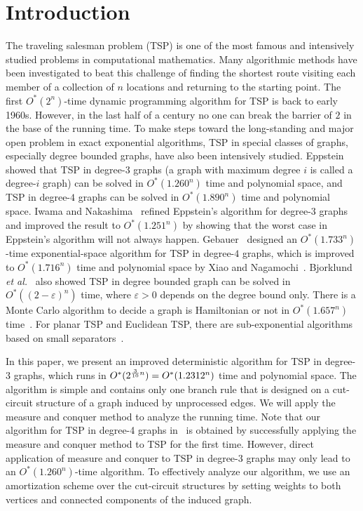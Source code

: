 \documentclass[runningheads]{llncs}
\begin{document}
\section{Introduction}
The traveling salesman problem (TSP) is one of the most famous and intensively studied problems in computational mathematics. Many algorithmic methods have been investigated to beat this challenge of finding the shortest route visiting each member of a collection of $n$ locations and returning to the starting point.
 The first $O^*(2^n)$-time dynamic programming algorithm for TSP is back to early 1960s.
 However, in the last half of a century no one can break the barrier of $2$ in the base of the running time.
To make steps toward the long-standing and major open problem in exact exponential algorithms,
TSP in special classes of graphs, especially degree bounded graphs, have also been intensively studied.
Eppstein~\cite{Eppstein:TSP3} showed that TSP in degree-$3$ graphs (a graph with maximum degree $i$ is called a degree-$i$ graph) can be solved in $O^*(1.260^n)$ time and polynomial space, and TSP in degree-$4$ graphs can be solved in $O^*(1.890^n)$ time and polynomial space. Iwama and Nakashima~\cite{Iwama:TSP3} refined Eppstein's algorithm for degree-$3$ graphs and improved the result to $O^*(1.251^n)$ by showing that the worst case in Eppstein's algorithm will not always happen. Gebauer~\cite{Gebauer:TSP4} designed an $O^*(1.733^n)$-time exponential-space algorithm for TSP in degree-$4$ graphs,
which is improved to  $O^*(1.716^n)$ time and polynomial space by
Xiao and Nagamochi~\cite{XN:tsp4}.
Bjorklund \emph{et al.}~\cite{Bjorklund:TSPbounded} also showed TSP in degree bounded graph can be solved in $O^*((2-\varepsilon)^n)$ time, where $\varepsilon>0$ depends on the degree bound only. There is a Monte Carlo algorithm to decide a graph is Hamiltonian or not in $O^*(1.657^n)$ time~\cite{Bjorklund:Hamiltonicity}. For planar TSP and Euclidean TSP, there are sub-exponential algorithms based on small separators~\cite{Dorn:Planar}.

In this paper, we present an improved deterministic algorithm for TSP in degree-$3$ graphs, which runs in $O^*(2^{{{3}\over{10}}n})=O^*(1.2312^n)$ time and polynomial space. The algorithm is simple and contains only
one branch rule that is designed on a cut-circuit structure of a graph induced by unprocessed edges.
We will apply the measure and conquer method to analyze the running time. Note that our algorithm for TSP
in degree-4 graphs in~\cite{XN:tsp4} is obtained by successfully applying the measure and conquer method to TSP for the first time. However, direct application of measure and conquer to TSP in degree-3 graphs may only lead to an $O^*(1.260^n)$-time algorithm. To effectively analyze our algorithm, we use an amortization scheme over the cut-circuit structures by setting weights to both vertices and connected components of the induced graph.
\end{document}
